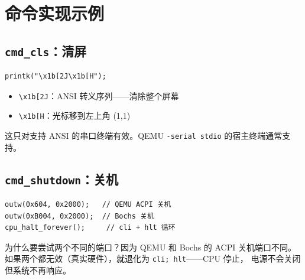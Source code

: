 \section{命令实现示例}

\subsection{\texttt{cmd\_cls}：清屏}

\begin{lstlisting}[style=cstyle]
printk("\x1b[2J\x1b[H");
\end{lstlisting}

\begin{itemize}
  \item \texttt{\textbackslash x1b[2J}：ANSI 转义序列——清除整个屏幕
  \item \texttt{\textbackslash x1b[H}：光标移到左上角 (1,1)
\end{itemize}

这只对支持 ANSI 的串口终端有效。QEMU \texttt{-serial stdio} 的宿主终端通常支持。

\subsection{\texttt{cmd\_shutdown}：关机}

\begin{lstlisting}[style=cstyle]
outw(0x604, 0x2000);   // QEMU ACPI 关机
outw(0xB004, 0x2000);  // Bochs 关机
cpu_halt_forever();     // cli + hlt 循环
\end{lstlisting}

\begin{whybox}
为什么要尝试两个不同的端口？因为 QEMU 和 Bochs 的 ACPI 关机端口不同。
如果两个都无效（真实硬件），就退化为 \texttt{cli; hlt}——CPU 停止，
电源不会关闭但系统不再响应。
\end{whybox}


